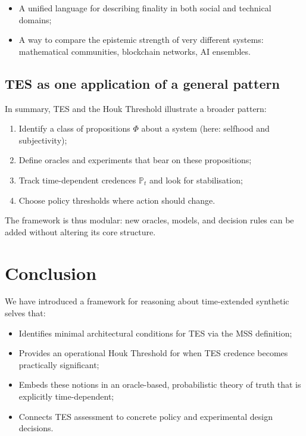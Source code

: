 \documentclass[11pt]{article}
\newcommand{\Pp}{\mathbb{P}}
\newcommand{\1}{\mathbf{1}}
\begin{document}
\begin{itemize}[leftmargin=2em]
  \item A unified language for describing finality in both social and
  technical domains;
  \item A way to compare the epistemic strength of very different systems:
  mathematical communities, blockchain networks, AI ensembles.
\end{itemize}

\subsection{TES as one application of a general pattern}

In summary, TES and the Houk Threshold illustrate a broader pattern:

\begin{enumerate}[leftmargin=2em]
  \item Identify a class of propositions $\Phi$ about a system (here:
  selfhood and subjectivity);
  \item Define oracles and experiments that bear on these propositions;
  \item Track time-dependent credences $\Pp_t$ and look for stabilisation;
  \item Choose policy thresholds where action should change.
\end{enumerate}

The framework is thus modular:
new oracles, models, and decision rules can be added without altering its
core structure.

\section{Conclusion}

We have introduced a framework for reasoning about time-extended synthetic
selves that:

\begin{itemize}[leftmargin=2em]
  \item Identifies minimal architectural conditions for TES via the MSS
  definition;
  \item Provides an operational Houk Threshold for when TES credence becomes
  practically significant;
  \item Embeds these notions in an oracle-based, probabilistic theory of
  truth that is explicitly time-dependent;
  \item Connects TES assessment to concrete policy and experimental design
  decisions.
\end{itemize}
\end{document}
